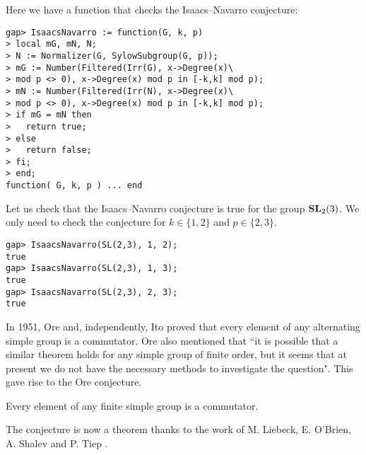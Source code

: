 \begin{example}
Here we have a function that checks the Isaacs--Navarro conjecture:
\begin{lstlisting}
gap> IsaacsNavarro := function(G, k, p)
> local mG, mN, N;
> N := Normalizer(G, SylowSubgroup(G, p));
> mG := Number(Filtered(Irr(G), x->Degree(x)\
> mod p <> 0), x->Degree(x) mod p in [-k,k] mod p);
> mN := Number(Filtered(Irr(N), x->Degree(x)\
> mod p <> 0), x->Degree(x) mod p in [-k,k] mod p);
> if mG = mN then
>   return true;
> else
>   return false;
> fi;
> end;
function( G, k, p ) ... end
\end{lstlisting}

Let us check that the Isaacs--Navarro conjecture is true for the group
$\mathbf{SL}_2(3)$. We only need to check the conjecture for $k\in\{1,2\}$ and
$p\in\{2,3\}$. 
\begin{lstlisting}
gap> IsaacsNavarro(SL(2,3), 1, 2);
true
gap> IsaacsNavarro(SL(2,3), 1, 3);
true
gap> IsaacsNavarro(SL(2,3), 2, 3);
true
\end{lstlisting}
\end{example}

In 1951, Ore and, independently, Ito
proved that every element of any alternating simple group is a commutator. Ore also mentioned that ``it is possible that a similar theorem holds for any simple group of finite order, but it seems that at present we do not have the necessary methods to investigate the question".
This gave rise to the Ore conjecture.

\begin{conjecture}[Ore]
    Every element of any finite simple group is a commutator.
\end{conjecture}

The conjecture is now a theorem thanks 
to the work of M. Liebeck, E. O'Brien, A. Shalev and P. Tiep \cite{MR2654085}.

